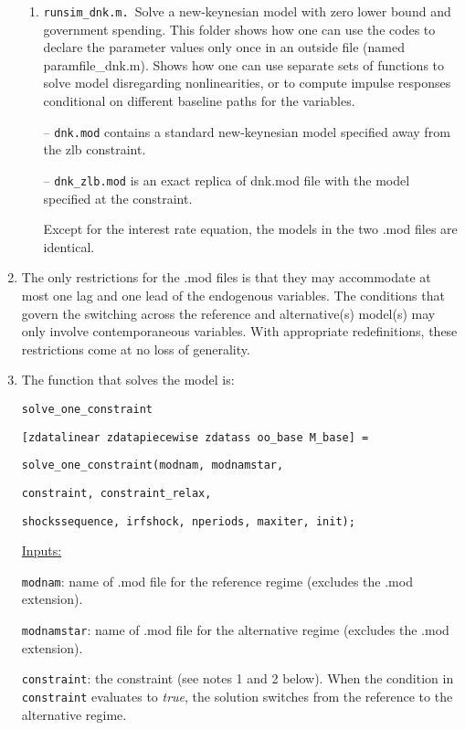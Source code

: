 \documentclass[12pt]{article}
\begin{document}
\begin{enumerate}
\begin{enumerate}
\item \texttt{runsim\_dnk.m. }Solve a new-keynesian model with zero lower
bound and government spending. This folder shows how one can use the codes
to declare the parameter values only once in an outside file (named
paramfile\_dnk.m). Shows how one can use separate sets of functions to solve
model disregarding nonlinearities, or to compute impulse responses
conditional on different baseline paths for the variables.

-- \texttt{dnk.mod} contains a standard new-keynesian model specified away
from the zlb constraint.

-- \texttt{dnk\_zlb.mod} is an exact replica of dnk.mod file with the model
specified at the constraint.

Except for the interest rate equation, the models in the two .mod files are
identical.
\end{enumerate}

\item The only restrictions for the .mod files is that they may accommodate
at most one lag and one lead of the endogenous variables. The conditions
that govern the switching across the reference and alternative(s) model(s)
may only involve contemporaneous variables. With appropriate redefinitions,
these restrictions come at no loss of generality.

\item The function that solves the model is:

\texttt{solve\_one\_constraint}

\texttt{[zdatalinear zdatapiecewise zdatass oo\_base M\_base] = }

\texttt{solve\_one\_constraint(modnam, modnamstar, }

\texttt{constraint, constraint\_relax, }

\texttt{shockssequence, irfshock, nperiods, maxiter, init);}

\medskip 

\underline{Inputs:}

\texttt{modnam}: name of .mod file for the reference regime (excludes the
.mod extension).

\texttt{modnamstar}: name of .mod file for the alternative regime (excludes
the .mod extension).

\texttt{constraint}: the constraint (see notes 1 and 2 below). When the
condition in \texttt{constraint} evaluates to \emph{true}, the solution
switches from the reference to the alternative regime.


\end{enumerate}
\end{document}
